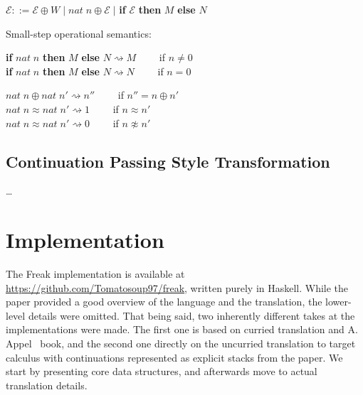 \documentclass[declaration,shortabstract]{iithesis}
\theoremstyle{definition} \newtheorem{definition}{Definition}[chapter]
\theoremstyle{remark} \newtheorem{remark}[definition]{Observation}
\theoremstyle{plain} \newtheorem{theorem}[definition]{Theorem}
\theoremstyle{plain} \newtheorem{lemma}[definition]{Lemma}
\begin{document}
    \begin{flushleft}
    $\mathcal{E} ::= \mathcal{E} \oplus W \; | \; nat \; n \oplus \mathcal{E} \; |$ \textbf{if} $\mathcal{E}$ \textbf{then} $M$ \textbf{else} $N$
    \end{flushleft}

    \begin{flushleft}
    Small-step operational semantics:
    \end{flushleft}

    \begin{flushleft}
    \textbf{if} $nat \; n$ \textbf{then} $M$ \textbf{else} $N \rightsquigarrow M \quad \quad $ if $n \neq 0$ \\
    \textbf{if} $nat \; n$ \textbf{then} $M$ \textbf{else} $N \rightsquigarrow N \quad \quad $ if $n = 0$
    \end{flushleft}

    \begin{flushleft}
    $nat \; n \oplus nat \; n' \rightsquigarrow n'' \quad \quad $    if $ n'' = n \oplus n' $ \\
    $nat \; n \approx nat \; n' \rightsquigarrow 1  \quad \quad $    \; if $ n \approx n' $ \\
    $nat \; n \approx nat \; n' \rightsquigarrow 0  \quad \quad $    \; if $ n \not\approx n' $

    \end{flushleft}

\section{Continuation Passing Style Transformation}
    \ldots

\chapter{Implementation}\label{sec:implementation}

    The Freak implementation is available at \href{https://github.com/Tomatosoup97/freak}{\underline{https://github.com/Tomatosoup97/freak}},
    written purely in Haskell. While the paper provided a good overview of the
    language and the translation, the lower-level details were omitted. That
    being said, two inherently different takes at the implementations were made.
    The first one is based on curried translation and A. Appel~\cite{appel-continuations}
    book, and the second one directly on the uncurried translation to target
    calculus with continuations represented as explicit stacks from the paper.
    We start by presenting core data structures, and afterwards move to actual
    translation details.
\end{document}
